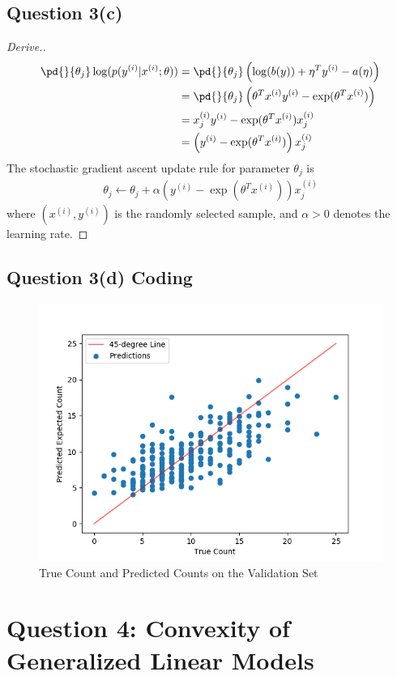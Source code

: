 \documentclass[11pt]{article}
\newcommand{\upi}[0]{^{(i)}}
\begin{document}
	\newpage
	\subsection{Question 3(c)}
	\begin{proof}[Derive.]
	\begin{align}
		\pd{}{\theta_j} \log (p(y\upi|x\upi; \theta)) &= \pd{}{\theta_j} 
		\left (\log(b(y)) + \eta^T y\upi - a(\eta) \right )\\
		&= \pd{}{\theta_j} \left (
		\theta^T x\upi y\upi - \exp(\theta^T x\upi)
		\right ) \\
		&= x\upi_j y\upi - \exp(\theta^T x\upi) x\upi_j \\
		&= \left(y\upi - \exp(\theta^T x\upi )\right) x\upi_j
	\end{align}
	The stochastic gradient ascent update rule for parameter $\theta_j$ is 
	\begin{align}
		\theta_j \leftarrow \theta_j + \alpha \left(y\upi - \exp(\theta^T x\upi )\right) x\upi_j
	\end{align}
	where $(x\upi, y\upi)$ is the randomly selected sample, and $\alpha > 0$ denotes the learning rate.
	\end{proof}
	
	\newpage
	\subsection{Question 3(d) Coding}
	\begin{figure}[h]
		\centering
		\includegraphics[width=0.6\linewidth]{src/poisson/poisson_pred.png}
		\caption{True Count and Predicted Counts on the Validation Set}
	\end{figure}
	
	\newpage
	\section{Question 4: Convexity of Generalized Linear Models}
\end{document}
